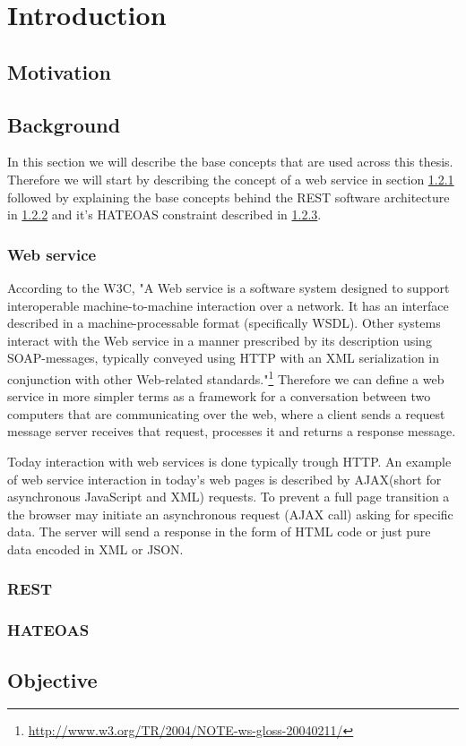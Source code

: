 \chapter{Introduction}
\label{chapter:intro}

\section{Motivation}
\label{sec:motivation}


\section{Background}
\label{sec:background}

In this section we will describe the base concepts that are used across this thesis. Therefore we will start by describing the concept of a web service in section \ref{sub-sec:web-service} followed by explaining the base concepts behind the REST software architecture in \ref{sub-sec:rest} and it's HATEOAS constraint described in \ref{sub-sec:hateoas}.

\subsection{Web service}
\label{sub-sec:web-service}

According to the W3C, "A Web service is a software system designed to support interoperable machine-to-machine interaction over a network. It has an interface described in a machine-processable format (specifically WSDL). Other systems interact with the Web service in a manner prescribed by its description using SOAP-messages, typically conveyed using HTTP with an XML serialization in conjunction with other Web-related standards."\footnote{\url{http://www.w3.org/TR/2004/NOTE-ws-gloss-20040211/}} Therefore we can define a web service in more simpler terms as a framework for a conversation between two computers that are communicating over the web, where a client sends a request message server receives that request, processes it and returns a response message.

Today interaction with web services is done typically trough HTTP. An example of web service interaction in today's web pages is described by AJAX(short for  asynchronous JavaScript and XML) requests. 	To prevent a full page transition a the browser may initiate an asynchronous request (AJAX call) asking for specific data. The server will send a response in the form of HTML code or just pure data encoded in XML or JSON.

\subsection{REST}
\label{sub-sec:rest}



\subsection{HATEOAS}
\label{sub-sec:hateoas}



\section{Objective}
\label{sec:objective}

